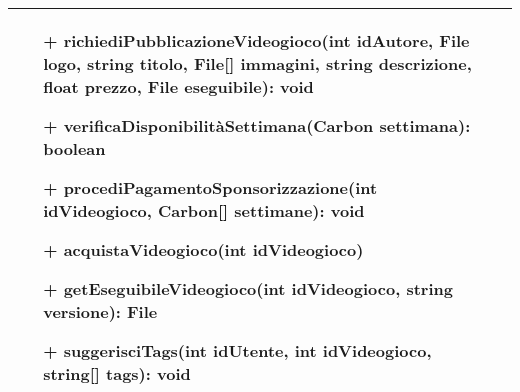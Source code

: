 \begin{tabular}{|| l | p{28em} ||}
\begin{itemize}
		\item[+] richiediPubblicazioneVideogioco(int idAutore, File logo, string titolo, File[] immagini, string descrizione, float prezzo, File eseguibile): void
		\item[+] verificaDisponibilitàSettimana(Carbon settimana): boolean
		\item[+] procediPagamentoSponsorizzazione(int idVideogioco, Carbon[] settimane): void
		\item[+] acquistaVideogioco(int idVideogioco)
		\item[+] getEseguibileVideogioco(int idVideogioco, string versione): File
		\item[+] suggerisciTags(int idUtente, int idVideogioco, string[] tags): void
	\end{itemize}\\
	\hline
\end{tabular}

\newpage
